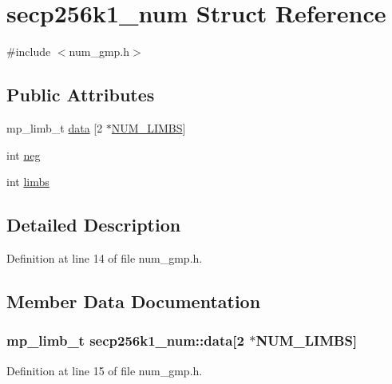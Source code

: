 \hypertarget{structsecp256k1__num}{}\section{secp256k1\+\_\+num Struct Reference}
\label{structsecp256k1__num}


{\ttfamily \#include $<$num\+\_\+gmp.\+h$>$}

\subsection*{Public Attributes}
\begin{DoxyCompactItemize}
\item 
mp\+\_\+limb\+\_\+t \hyperlink{structsecp256k1__num_aa8875ac503e1cc8ac5abef8d542d2c70}{data} \mbox{[}2 $\ast$\hyperlink{num__gmp_8h_aee9ddf197331cb600f0a5e5cb8ff146c}{N\+U\+M\+\_\+\+L\+I\+M\+B\+S}\mbox{]}
\item 
int \hyperlink{structsecp256k1__num_a5d762d76e2a0fe84313ed5e41397b10b}{neg}
\item 
int \hyperlink{structsecp256k1__num_ab283e099d0543cb7e222a9e74a39aa94}{limbs}
\end{DoxyCompactItemize}


\subsection{Detailed Description}


Definition at line 14 of file num\+\_\+gmp.\+h.



\subsection{Member Data Documentation}
\hypertarget{structsecp256k1__num_aa8875ac503e1cc8ac5abef8d542d2c70}{}
\subsubsection[{data}]{\setlength{\rightskip}{0pt plus 5cm}mp\+\_\+limb\+\_\+t secp256k1\+\_\+num\+::data\mbox{[}2 $\ast${\bf N\+U\+M\+\_\+\+L\+I\+M\+B\+S}\mbox{]}}\label{structsecp256k1__num_aa8875ac503e1cc8ac5abef8d542d2c70}


Definition at line 15 of file num\+\_\+gmp.\+h.

\hypertarget{structsecp256k1__num_ab283e099d0543cb7e222a9e74a39aa94}{}
